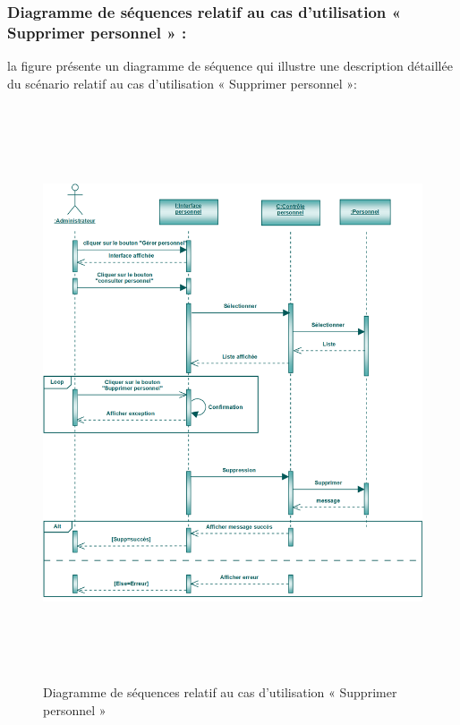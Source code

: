 \documentclass[12 pt ]{report}
\begin{document}
\subsubsection{Diagramme de séquences relatif au cas d’utilisation « Supprimer personnel » :}
la figure   présente un diagramme de séquence qui illustre une description détaillée du scénario relatif au cas d’utilisation « Supprimer personnel »: 
\begin{figure}[h]
 \begin{center}
\includegraphics[width= 18 cm ,height=  17cm]{sec_sup_per.PNG}
\caption{Diagramme de séquences relatif au cas d’utilisation « Supprimer personnel  »}

\end{center}
\end{figure}
\newpage
\end{document}
